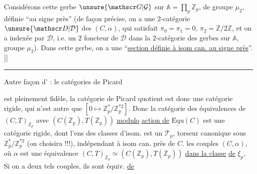 
Considérons cette gerbe $\unsure{\mathscr G|\mathcal G}$  sur $\mathbb A=\prod_p\mathbb Z_p$, de
groupe $\mu_2$, définie ``au signe près'' (de
façon précise, on a une $2$-catégorie $\unsure{\mathscr D|\mathcal D}$ des $(C,\alpha)$,
qui satisfait $\pi_0=\pi_1=0$, $\pi_2=\mathbb Z/2\mathbb Z$, et  on
a   indexée par $\mathscr D$, i.e. un $2$ foncteur
de $\mathscr D$ dans la $2$-catégorie des  gerbes sur $\mathbb A$,
groupe $\mu_2$). Dans cette gerbe, on a une
``\uline{section définie à isom can. au signe près}''. $]]$


\noindent\rule{2cm}{0.4pt}
Autre façon d' : le  
catégories de Picard 


est pleinement fidèle, la catégorie de Picard quotient est
donc une catégorie rigide, qui n'est autre que
$[0\mapsto\mathbb Z_p^*/\mathbb Z_p^{*2}]$. Donc la catégorie des équivalences de
$(C,T)_{\mathbb Z_p}$ avec $(C(\mathbb Z_p),T(\mathbb Z_p))$ \deleted{\unsure{$\to$}} \uline{modulo} \uline{action de} $\underline{\mathrm{Equ}}(C)$
est une catégorie rigide,  dont l'ens des
classes d'isom. est un $\mathcal T_p$, torseur canonique sous
$\mathbb Z_p^*/\mathbb Z_p^{*2}$ (on choisira !!!), indépendant à isom
can. près de $C$.  
 les
couples $(C,\alpha)$, où  $\alpha$ est une équivalence
$(C,T)_{\mathbb Z_p}\simeq(C(\mathbb Z_p),T(\mathbb Z_p))$ \uline{dans la classe} \uline{de} $\xi_p$, 
 Si on a deux tels couples, ils sont
 équiv. \uline{de} 
